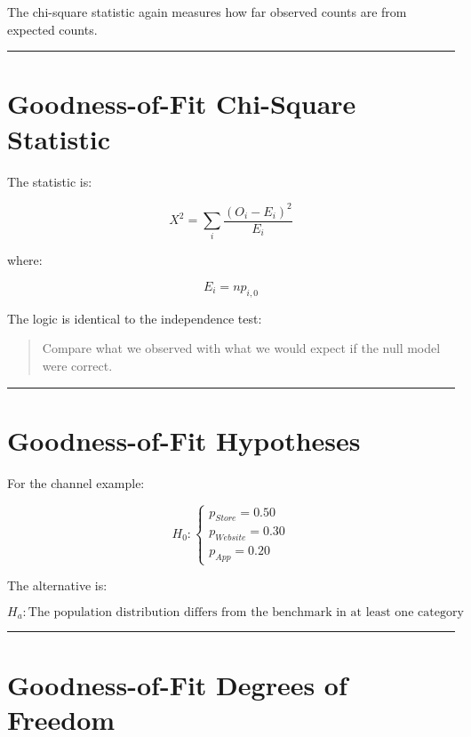 \documentclass[
  letterpaper,
  DIV=11,
  numbers=noendperiod]{scrreprt}
\begin{document}
The chi-square statistic again measures how far observed counts are from
expected counts.

\begin{center}\rule{0.5\linewidth}{0.5pt}\end{center}


\chapter{Goodness-of-Fit Chi-Square
Statistic}\label{goodness-of-fit-chi-square-statistic}

The statistic is:

\[
\boxed{
X^2
=
\sum_i
\frac{
(O_i-E_i)^2
}{
E_i
}
}
\]

where:

\[
E_i=np_{i,0}
\]

The logic is identical to the independence test:

\begin{quote}
Compare what we observed with what we would expect if the null model
were correct.
\end{quote}

\begin{center}\rule{0.5\linewidth}{0.5pt}\end{center}


\chapter{Goodness-of-Fit Hypotheses}\label{goodness-of-fit-hypotheses}

For the channel example:

\[
H_0:
\begin{cases}
p_{Store}=0.50\\
p_{Website}=0.30\\
p_{App}=0.20
\end{cases}
\]

The alternative is:

\[
H_a:
\text{The population distribution differs from the benchmark in at least one category}
\]

\begin{center}\rule{0.5\linewidth}{0.5pt}\end{center}


\chapter{Goodness-of-Fit Degrees of
Freedom}\label{goodness-of-fit-degrees-of-freedom}
\end{document}
